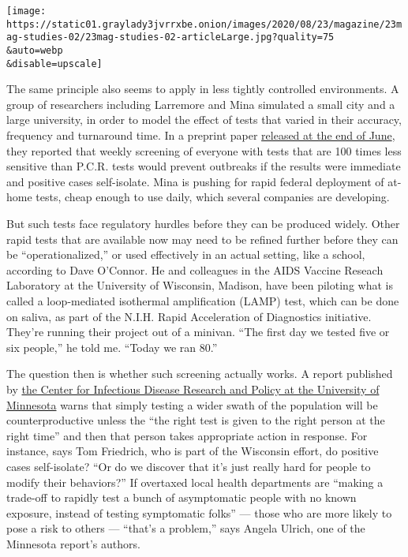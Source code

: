 \texttt{[image: https://static01.graylady3jvrrxbe.onion/images/2020/08/23/magazine/23mag-studies-02/23mag-studies-02-articleLarge.jpg?quality=75\\\&auto=webp\\\&disable=upscale]}

The same principle also seems to apply in less tightly controlled
environments. A group of researchers including Larremore and Mina
simulated a small city and a large university, in order to model the
effect of tests that varied in their accuracy, frequency and turnaround
time. In a preprint paper
\href{https://www.medrxiv.org/content/10.1101/2020.06.22.20136309v2.full.pdf}{released
at the end of June}, they reported that weekly screening of everyone
with tests that are 100 times less sensitive than P.C.R. tests would
prevent outbreaks if the results were immediate and positive cases
self-isolate. Mina is pushing for rapid federal deployment of at-home
tests, cheap enough to use daily, which several companies are
developing.

But such tests face regulatory hurdles before they can be produced
widely. Other rapid tests that are available now may need to be refined
further before they can be ``operationalized,'' or used effectively in
an actual setting, like a school, according to Dave O'Connor. He and
colleagues in the AIDS Vaccine Reseach Laboratory at the University of
Wisconsin, Madison, have been piloting what is called a loop-mediated
isothermal amplification (LAMP) test, which can be done on saliva, as
part of the N.I.H. Rapid Acceleration of Diagnostics initiative. They're
running their project out of a minivan. ``The first day we tested five
or six people,'' he told me. ``Today we ran 80.''

The question then is whether such screening actually works. A report
published by
\href{https://www.cidrap.umn.edu/sites/default/files/public/downloads/cidrap-covid19-viewpoint-part3.pdf}{the
Center for Infectious Disease Research and Policy at the University of
Minnesota} warns that simply testing a wider swath of the population
will be counterproductive unless the ``the right test is given to the
right person at the right time'' and then that person takes appropriate
action in response. For instance, says Tom Friedrich, who is part of the
Wisconsin effort, do positive cases self-isolate? ``Or do we discover
that it's just really hard for people to modify their behaviors?'' If
overtaxed local health departments are ``making a trade-off to rapidly
test a bunch of asymptomatic people with no known exposure, instead of
testing symptomatic folks'' --- those who are more likely to pose a risk
to others --- ``that's a problem,'' says Angela Ulrich, one of the
Minnesota report's authors.

